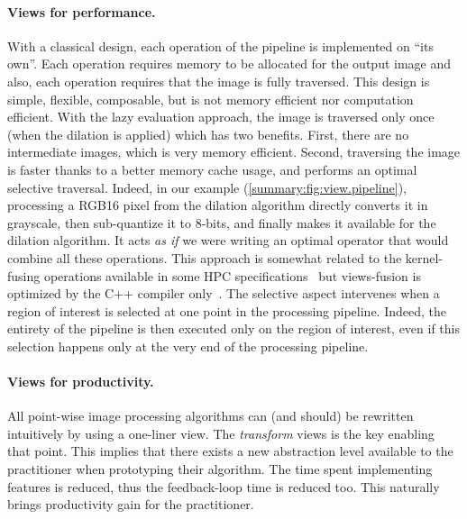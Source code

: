 \paragraph{Views for performance.} With a classical design, each operation of the pipeline is implemented on ``its
own''. Each operation requires memory to be allocated for the output image and also, each operation requires that the
image is fully traversed. This design is simple, flexible, composable, but is not memory efficient nor computation
efficient. With the lazy evaluation approach, the image is traversed only once (when the dilation is applied) which has
two benefits. First, there are no intermediate images, which is very memory efficient. Second, traversing the image is
faster thanks to a better memory cache usage, and performs an optimal selective traversal. Indeed, in our example
(\cref{summary:fig:view.pipeline}), processing a RGB16 pixel from the dilation algorithm directly converts it in
grayscale, then sub-quantize it to 8-bits, and finally makes it available for the dilation algorithm. It acts \emph{as
if} we were writing an optimal operator that would combine all these operations. This approach is somewhat related to
the kernel-fusing operations available in some HPC specifications~\parencite{openvx.2019} but views-fusion is optimized
by the C++ compiler only~\parencite{brown.2018.ranges}. The selective aspect intervenes when a region of interest is
selected at one point in the processing pipeline. Indeed, the entirety of the pipeline is then executed only on the
region of interest, even if this selection happens only at the very end of the processing pipeline.

\paragraph{Views for productivity.} All point-wise image processing algorithms can (and should) be rewritten intuitively
by using a one-liner view. The \emph{transform} views is the key enabling that point. This implies that there exists a
new abstraction level available to the practitioner when prototyping their algorithm. The time spent implementing
features is reduced, thus the feedback-loop time is reduced too. This naturally brings productivity gain for the
practitioner.

